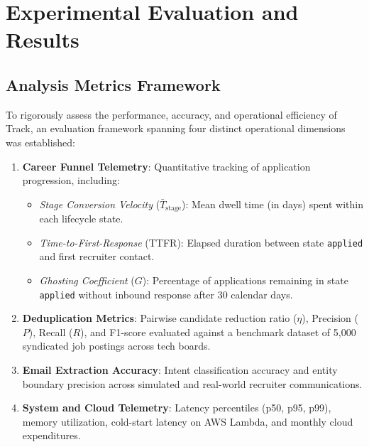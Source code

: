 \chapter{Experimental Evaluation and Results}
\label{ch:evaluation_results}

\section{Analysis Metrics Framework}
To rigorously assess the performance, accuracy, and operational efficiency of Track, an evaluation framework spanning four distinct operational dimensions was established:

\begin{enumerate}
    \item \textbf{Career Funnel Telemetry}: Quantitative tracking of application progression, including:
    \begin{itemize}
        \item \textit{Stage Conversion Velocity} ($\bar{T}_{\text{stage}}$): Mean dwell time (in days) spent within each lifecycle state.
        \item \textit{Time-to-First-Response} (TTFR): Elapsed duration between state \texttt{applied} and first recruiter contact.
        \item \textit{Ghosting Coefficient} ($G$): Percentage of applications remaining in state \texttt{applied} without inbound response after 30 calendar days.
    \end{itemize}
    \item \textbf{Deduplication Metrics}: Pairwise candidate reduction ratio ($\eta$), Precision ($P$), Recall ($R$), and F1-score evaluated against a benchmark dataset of 5,000 syndicated job postings across tech boards.
    \item \textbf{Email Extraction Accuracy}: Intent classification accuracy and entity boundary precision across simulated and real-world recruiter communications.
    \item \textbf{System and Cloud Telemetry}: Latency percentiles (p50, p95, p99), memory utilization, cold-start latency on AWS Lambda, and monthly cloud expenditures.
\end{enumerate}

